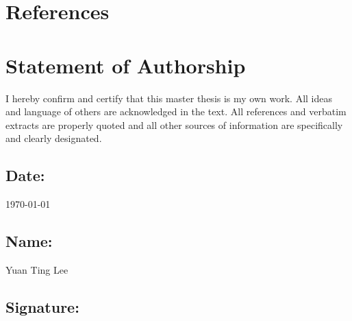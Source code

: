 \documentclass[12pt,onecolumn,twoside]{layout}
\begin{document}
\showacknow{} %
\clearpage
\section*{References}


\clearpage

\section{Statement of Authorship}
I hereby confirm and certify that this master thesis is my own work. All ideas and language of others are acknowledged in the text. All references and verbatim extracts are properly quoted and all other sources of information are specifically and clearly designated. 

\subsection*{Date:} \today


\subsection*{Name:} Yuan Ting Lee


\subsection*{Signature:}
\end{document}
